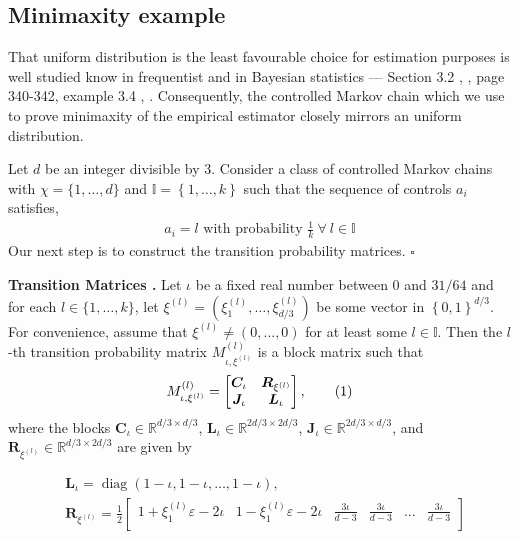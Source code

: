 \documentclass[opre,sglanonrev]{informs4}
\numberwithin{equation}{section}
\newcommand{\pow}[1]{^{(#1)}}
\newcommand{\lc}{\left\{}
\newcommand{\rc}{\right\}}
\newcommand{\Ibb}{\mathbb{I}}
\newcommand{\Rbb}{\mathbb{R}}
\newcommand\numberthis{\addtocounter{equation}{1}\tag{\theequation}}
\newcommand{\whiteqed}{\hfill$\square$\par\bigskip}
\newcommand{\diag}{\operatorname{diag}}
\newcommand{\eps}{\varepsilon}
\begin{document}
\begin{APPENDICES}
\section{Minimaxity example}\label{sec:minmax-ex}
{\color{black}
That uniform distribution is the least favourable choice for estimation purposes is well studied know in frequentist and in Bayesian statistics --- Section 3.2 \citet{brandwein1980minimax}, \citet{van2006minimax}, page 340-342, example 3.4 \citet{lehmann2006theory}, \citet{fourdrinier2013bayes}. 
Consequently, the controlled Markov chain which we use to prove minimaxity of the empirical estimator closely mirrors an uniform distribution.

Let $d$ be an integer divisible by 3. Consider a class of controlled Markov chains with $\chi=\{1,\dots,d\}$ and $\Ibb=\lc1,\dots,k\rc$ such that the sequence of controls $a_i$ satisfies,
\begin{align}
    a_i= l \text{ with probability } \frac{1}{k} \ \forall\ l\in\Ibb
    \label{eq:mm-ex2eq1}
\end{align}
Our next step is to construct the transition probability matrices.  \whiteqed
\textbf{Transition Matrices .} Let $\iota$ be a fixed real number between $0$ and $31/64$ and for each $l\in \{1,\dots,k\}$, let $\xi\pow{l}=(\xi_1\pow{l},\dots,\xi_{d/3}\pow{l})$ be some vector in $\lc0,1\rc^{d/3}$. For convenience, assume that $\xi\pow{l}\neq (0,\dots,0)$ for at least some $l\in\Ibb$. Then the $l$-th transition probability matrix $M_{\iota,\xi\pow{l}}\pow{l}$ is a block matrix such that
\begin{align*}
M_{\iota,\xi^{(l)}}^{(l)}
  = 
\begin{bmatrix}
\boldsymbol{C}_{\iota} & \boldsymbol{R}_{\xi^{(l)}} \\
\boldsymbol{J}_{\iota} & \boldsymbol{L}_{\iota}
\end{bmatrix},\numberthis\label{eq:mm-ex2eq2}
\end{align*}
where the blocks
$\boldsymbol{C}_{\iota} \in \Rbb^{d/3\times d/3}$,
$  \boldsymbol{L}_{\iota}  \in\Rbb^{2d/3\times2d/3}$,
$\boldsymbol{J}_{\iota}\in \Rbb^{2d/3\times d/3}$,
and
$\boldsymbol{R}_{\xi^{(l)}} \in\Rbb^{d/3\times 2d/3}$
are given by
\begin{small}
\begin{align*}
&\boldsymbol{L}_{\iota}  = \diag\left(1-\iota,1-\iota,\dots,1-\iota \right),\\
&\boldsymbol{R}_{\xi^{(l)}}  = \frac{1}{2}
\begin{bmatrix}
1 +  \xi^{(l)}_1\eps-2\iota & 1 -  \xi^{(l)}_1\eps-2\iota  & \frac{3\iota}{d-3} & \frac{3\iota}{d-3} & \hdots &  \frac{3\iota}{d-3} \\

\end{bmatrix}
\end{align*}
\end{small}}
\end{APPENDICES}
\end{document}
